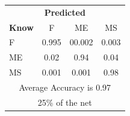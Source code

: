 \documentclass[12pt]{article} %
\begin{document}
\begin{minipage}{0.5\textwidth}
\begin{center}
\begin{tabular}{l|c|c|c|}
 \multicolumn{4}{c}{ \textbf{ Predicted}}\\
 \textbf{Know}&F&ME&MS\\ \hline\hline
F   &0.995&00.002&0.003\\
ME &0.02&0.94&0.04\\
MS &0.001&0.001&0.98\\
\multicolumn{4}{c}{Average Accuracy is 0.97}\\
\multicolumn{4}{c}{25\%  of the net}\\
\end{tabular}
\end{center}
\end{minipage}
\end{document}
